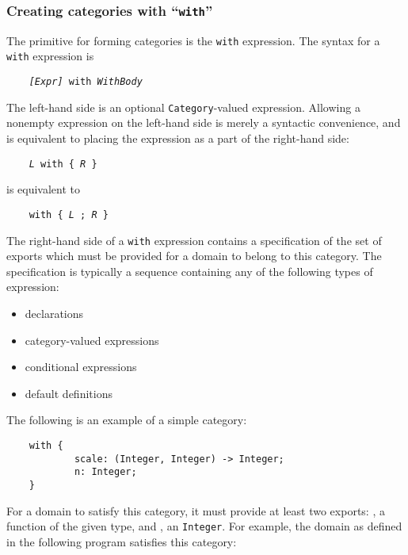 {%
\subsubsection{Creating categories with ``{\tt with}''}

The primitive for forming categories is the \verb"with" expression. 
The syntax for a \verb"with" expression is

\verb"    "{\tt {\em [Expr]\/} with {\em WithBody}}

The left-hand side is an optional \verb"Category"-valued expression.
Allowing a nonempty expression on the left-hand side is merely
a syntactic convenience, and is equivalent to placing the expression
as a part of the right-hand side:

\verb"    "{\tt {\em L} with \{ {\em R} \}}

is equivalent to 

\verb"    "{\tt with \{ {\em L\/} ; {\em R\/} \}}

The right-hand side of a \verb"with" expression contains a specification
of the set of exports which  must be provided for a domain to belong
to this category. The specification is typically a sequence containing
any of the following types of expression:

\begin{itemize}
\item declarations
\item category-valued expressions
\item conditional expressions
\item default definitions
\end{itemize}

The following is an example of a simple category:

\begin{small}
\begin{verbatim}
    with {
            scale: (Integer, Integer) -> Integer;
            n: Integer;
    }
\end{verbatim}
\end{small}

For a domain to satisfy this category, it must provide at least two exports:
, a function of the given type, and , an \verb"Integer".
For example, the domain  as defined in the following program
satisfies this category:

}
